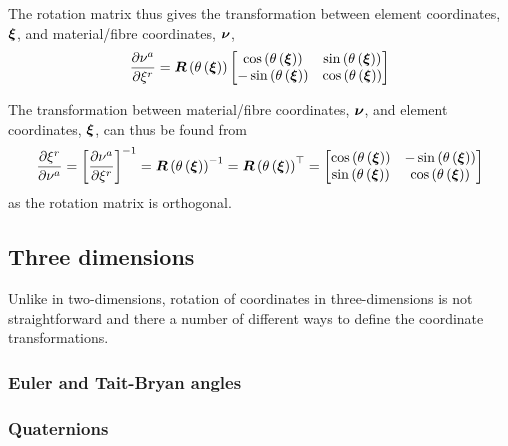 The rotation matrix thus gives the transformation between element coordinates, $ \boldsymbol{\xi} $, and material/fibre coordinates, $ \boldsymbol{\nu} $, \ie
\begin{equation}
  \delby{\nu^{a}}{\xi^{r}}=\fnof{\matr{R}}{\fnof{\theta}{\vectr{\xi}}}\begin{bmatrix}
  \cosine{\fnof{\theta}{\vectr{\xi}}} & \sine{\fnof{\theta}{\vectr{\xi}}} \\
  -\sine{\fnof{\theta}{\vectr{\xi}}} & \cosine{\fnof{\theta}{\vectr{\xi}}}
  \end{bmatrix}  
  \label{eqn:ElementToMaterialTransformationTwoD}
\end{equation}

The transformation between material/fibre coordinates, $ \boldsymbol{\nu} $,
and element coordinates, $ \boldsymbol{\xi} $, can thus be found from
\begin{equation}
  \delby{\xi^{r}}{\nu^{a}}=\inverse{\sqbrac{\delby{\nu^{a}}{\xi^{r}}}}=\inverse{\fnof{\matr{R}}{\fnof{\theta}{\vectr{\xi}}}}=
  \transpose{\fnof{\matr{R}}{\fnof{\theta}{\vectr{\xi}}}}=\begin{bmatrix}
  \cosine{\fnof{\theta}{\vectr{\xi}}} & -\sine{\fnof{\theta}{\vectr{\xi}}} \\
  \sine{\fnof{\theta}{\vectr{\xi}}} & \cosine{\fnof{\theta}{\vectr{\xi}}}
  \end{bmatrix}  
  \label{eqn:MaterialToElementTransformationTwoD}
\end{equation}
as the rotation matrix is orthogonal.

\subsection{Three dimensions}
\label{subsec:MaterialCoordinateTransformationsThreeD}

Unlike in two-dimensions, rotation of coordinates in three-dimensions
is not straightforward and there a number of different ways to define
the coordinate transformations.

\subsubsection{Euler and Tait-Bryan angles}
\label{subsubsec:MaterialCoordinateTransformationsThreeDEulerTaitBryan}

\subsubsection{Quaternions}
\label{subsubsec:MaterialCoordinateTransformationsThreeDQuaternions}


